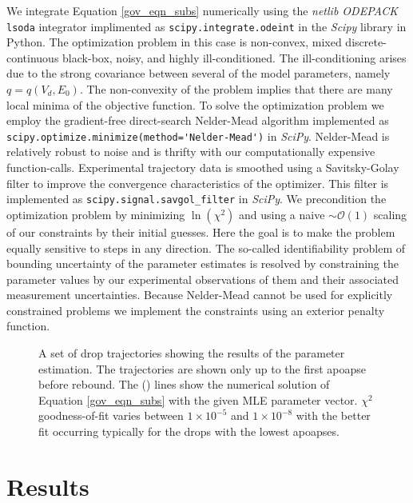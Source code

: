 \documentclass[aip,reprint, floatfix]{revtex4-1}
\begin{document}
We integrate Equation \ref{gov_eqn_subs} numerically using the \emph{netlib ODEPACK} \verb|lsoda| integrator implimented as \verb|scipy.integrate.odeint| in the \emph{Scipy} \cite{oliphant_python_2007} library in Python. The optimization problem in this case is non-convex, mixed discrete-continuous black-box, noisy, and highly ill-conditioned. The ill-conditioning arises due to the strong covariance between several of the model parameters, namely $q=q(V_d, E_0)$. The non-convexity of the problem implies that there are many local minima of the objective function. To solve the optimization problem we employ the gradient-free direct-search Nelder-Mead \cite{nelder_simplex_1965} algorithm implemented as \verb|scipy.optimize.minimize(method='Nelder-Mead')| in \emph{SciPy}. Nelder-Mead is relatively robust to noise and is thrifty with our computationally expensive function-calls. Experimental trajectory data is smoothed using a Savitsky-Golay filter \cite{savitzky_smoothing_1964} to improve the convergence characteristics of the optimizer. This filter is implemented as \verb|scipy.signal.savgol_filter| in \emph{SciPy}. We precondition the optimization problem by minimizing $\ln(\chi^2)$ and using a naive $\sim \mathcal{O}(1)$ scaling of our constraints by their initial guesses. Here the goal is to make the problem equally sensitive to steps in any direction. The so-called identifiability problem of bounding uncertainty of the parameter estimates is resolved by constraining the parameter values by our experimental observations of them and their associated measurement uncertainties. Because Nelder-Mead cannot be used for explicitly constrained problems we implement the constraints using an exterior penalty function.

\begin{figure}[h]
    \centering
    \resizebox{0.5\textwidth}{!}{}
    \caption{A set of drop trajectories showing the results of the parameter estimation. The trajectories are shown only up to the first apoapse before rebound. The (\protect\redline) lines show the numerical solution of Equation \ref{gov_eqn_subs} with the given MLE parameter vector. $\chi^2$ goodness-of-fit varies between $1 \times 10^{-5}$ and $1 \times 10^{-8}$ with the better fit occurring typically for the drops with the lowest apoapses.}
    \label{fig:inverse_problem}
\end{figure}

\section{Results}
\end{document}
